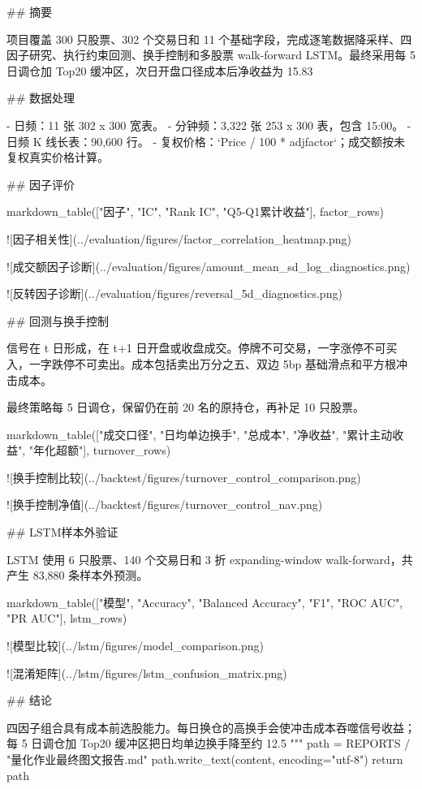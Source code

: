 \documentclass[UTF8,a4paper,fontset=fandol]{ctexart}
\begin{document}
\begin{ProjectCode}
{## 摘要

项目覆盖 300 只股票、302 个交易日和 11 个基础字段，完成逐笔数据降采样、四因子研究、执行约束回测、换手控制和多股票 walk-forward LSTM。最终采用每 5 日调仓加 Top20 缓冲区，次日开盘口径成本后净收益为 15.83%

## 数据处理

- 日频：11 张 302 x 300 宽表。
- 分钟频：3,322 张 253 x 300 表，包含 15:00。
- 日频 K 线长表：90,600 行。
- 复权价格：`Price / 100 * adjfactor`；成交额按未复权真实价格计算。

## 因子评价

{markdown_table(["因子", "IC", "Rank IC", "Q5-Q1累计收益"], factor_rows)}

![因子相关性](../evaluation/figures/factor_correlation_heatmap.png)

![成交额因子诊断](../evaluation/figures/amount_mean_sd_log_diagnostics.png)

![反转因子诊断](../evaluation/figures/reversal_5d_diagnostics.png)

## 回测与换手控制

信号在 t 日形成，在 t+1 日开盘或收盘成交。停牌不可交易，一字涨停不可买入，一字跌停不可卖出。成本包括卖出万分之五、双边 5bp 基础滑点和平方根冲击成本。

最终策略每 5 日调仓，保留仍在前 20 名的原持仓，再补足 10 只股票。

{markdown_table(["成交口径", "日均单边换手", "总成本", "净收益", "累计主动收益", "年化超额"], turnover_rows)}

![换手控制比较](../backtest/figures/turnover_control_comparison.png)

![换手控制净值](../backtest/figures/turnover_control_nav.png)

## LSTM样本外验证

LSTM 使用 6 只股票、140 个交易日和 3 折 expanding-window walk-forward，共产生 83,880 条样本外预测。

{markdown_table(["模型", "Accuracy", "Balanced Accuracy", "F1", "ROC AUC", "PR AUC"], lstm_rows)}

![模型比较](../lstm/figures/model_comparison.png)

![混淆矩阵](../lstm/figures/lstm_confusion_matrix.png)

## 结论

四因子组合具有成本前选股能力。每日换仓的高换手会使冲击成本吞噬信号收益；每 5 日调仓加 Top20 缓冲区把日均单边换手降至约 12.5%
"""
    path = REPORTS / "量化作业最终图文报告.md"
    path.write_text(content, encoding="utf-8")
    return path


}
\end{ProjectCode}
\end{document}

